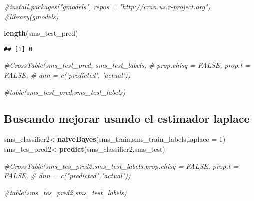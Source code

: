 \documentclass[]{article}
\newenvironment{Shaded}{\begin{snugshade}}{\end{snugshade}}
\newcommand{\KeywordTok}[1]{\textcolor[rgb]{0.13,0.29,0.53}{\textbf{#1}}}
\newcommand{\DataTypeTok}[1]{\textcolor[rgb]{0.13,0.29,0.53}{#1}}
\newcommand{\DecValTok}[1]{\textcolor[rgb]{0.00,0.00,0.81}{#1}}
\newcommand{\CommentTok}[1]{\textcolor[rgb]{0.56,0.35,0.01}{\textit{#1}}}
\newcommand{\NormalTok}[1]{#1}
\begin{document}
\begin{Shaded}
\begin{Highlighting}[]
\CommentTok{#install.packages("gmodels", repos = "http://cran.us.r-project.org")}
\CommentTok{#library(gmodels)}

\KeywordTok{length}\NormalTok{(sms_test_pred)}
\end{Highlighting}
\end{Shaded}

\begin{verbatim}
## [1] 0
\end{verbatim}

\begin{Shaded}
\begin{Highlighting}[]
\CommentTok{#CrossTable(sms_test_pred, sms_test_labels,}
 \CommentTok{#   prop.chisq = FALSE, prop.t = FALSE,}
  \CommentTok{#  dnn = c('predicted', 'actual'))}

\CommentTok{#table(sms_test_pred,sms_test_labels)}
\end{Highlighting}
\end{Shaded}

\subsection{Buscando mejorar usando el estimador
laplace}\label{buscando-mejorar-usando-el-estimador-laplace}

\begin{Shaded}
\begin{Highlighting}[]
\NormalTok{sms_classifier2<-}\KeywordTok{naiveBayes}\NormalTok{(sms_train,sms_train_labels,}\DataTypeTok{laplace =} \DecValTok{1}\NormalTok{)}
\NormalTok{sms_tes_pred2<-}\KeywordTok{predict}\NormalTok{(sms_classifier2,sms_test)}

\CommentTok{#CrossTable(sms_tes_pred2,sms_test_labels,prop.chisq = FALSE, prop.t = FALSE,}
         \CommentTok{#  dnn = c("predicted","actual"))}

\CommentTok{#table(sms_tes_pred2,sms_test_labels)}
\end{Highlighting}
\end{Shaded}
\end{document}

